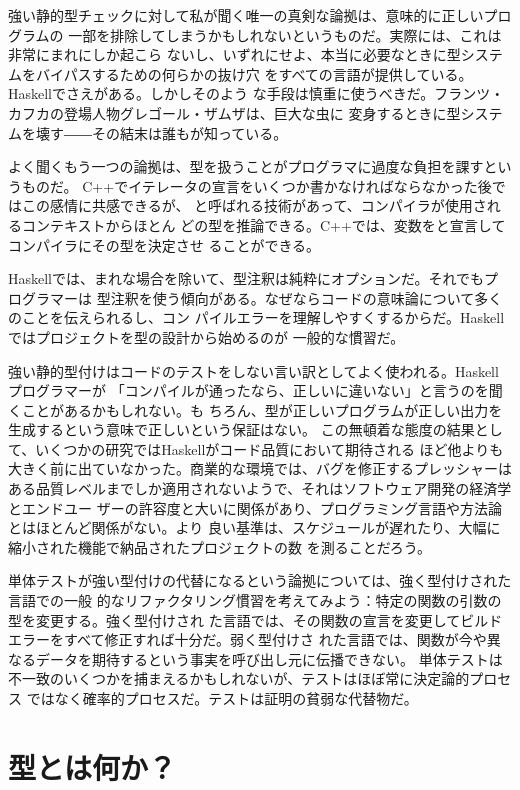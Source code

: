 強い静的型チェックに対して私が聞く唯一の真剣な論拠は、意味的に正しいプログラムの
一部を排除してしまうかもしれないというものだ。実際には、これは非常にまれにしか起こら
ないし、いずれにせよ、本当に必要なときに型システムをバイパスするための何らかの抜け穴
をすべての言語が提供している。Haskellでさえがある。しかしそのよう
な手段は慎重に使うべきだ。フランツ・カフカの登場人物グレゴール・ザムザは、巨大な虫に
変身するときに型システムを壊す――その結末は誰もが知っている。

よく聞くもう一つの論拠は、型を扱うことがプログラマに過度な負担を課すというものだ。
C++でイテレータの宣言をいくつか書かなければならなかった後ではこの感情に共感できるが、
と呼ばれる技術があって、コンパイラが使用されるコンテキストからほとん
どの型を推論できる。C++では、変数をと宣言してコンパイラにその型を決定させ
ることができる。

Haskellでは、まれな場合を除いて、型注釈は純粋にオプションだ。それでもプログラマーは
型注釈を使う傾向がある。なぜならコードの意味論について多くのことを伝えられるし、コン
パイルエラーを理解しやすくするからだ。Haskellではプロジェクトを型の設計から始めるのが
一般的な慣習だ。

強い静的型付けはコードのテストをしない言い訳としてよく使われる。Haskellプログラマーが
「コンパイルが通ったなら、正しいに違いない」と言うのを聞くことがあるかもしれない。も
ちろん、型が正しいプログラムが正しい出力を生成するという意味で正しいという保証はない。
この無頓着な態度の結果として、いくつかの研究ではHaskellがコード品質において期待される
ほど他よりも大きく前に出ていなかった。商業的な環境では、バグを修正するプレッシャーは
ある品質レベルまでしか適用されないようで、それはソフトウェア開発の経済学とエンドユー
ザーの許容度と大いに関係があり、プログラミング言語や方法論とはほとんど関係がない。より
良い基準は、スケジュールが遅れたり、大幅に縮小された機能で納品されたプロジェクトの数
を測ることだろう。

単体テストが強い型付けの代替になるという論拠については、強く型付けされた言語での一般
的なリファクタリング慣習を考えてみよう：特定の関数の引数の型を変更する。強く型付けされ
た言語では、その関数の宣言を変更してビルドエラーをすべて修正すれば十分だ。弱く型付けさ
れた言語では、関数が今や異なるデータを期待するという事実を呼び出し元に伝播できない。
単体テストは不一致のいくつかを捕まえるかもしれないが、テストはほぼ常に決定論的プロセス
ではなく確率的プロセスだ。テストは証明の貧弱な代替物だ。

\section{型とは何か？}


